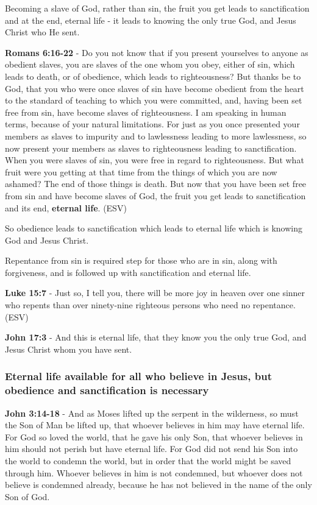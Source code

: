 \documentclass[11pt]{article}
\begin{document}
Becoming a slave of God, rather than sin, the fruit you get leads to sanctification and at the end, eternal life - it leads to knowing the only true God, and Jesus Christ who He sent.

\textbf{Romans 6:16-22} - Do you not know that if you present yourselves to anyone as obedient slaves, you are slaves of the one whom you obey, either of sin, which leads to death, or of obedience, which leads to righteousness? But thanks be to God, that you who were once slaves of sin have become obedient from the heart to the standard of teaching to which you were committed, and, having been set free from sin, have become slaves of righteousness. I am speaking in human terms, because of your natural limitations. For just as you once presented your members as slaves to impurity and to lawlessness leading to more lawlessness, so now present your members as slaves to righteousness leading to sanctification. When you were slaves of sin, you were free in regard to righteousness. But what fruit were you getting at that time from the things of which you are now ashamed? The end of those things is death. But now that you have been set free from sin and have become slaves of God, the fruit you get leads to sanctification and its end, \textbf{eternal life}. (ESV)

So obedience leads to sanctification which leads to eternal life which is knowing God and Jesus Christ.

Repentance from sin is required step for those who are in sin, along with forgiveness, and is followed up with sanctification and eternal life.

\textbf{Luke 15:7} - Just so, I tell you, there will be more joy in heaven over one sinner who repents than over ninety-nine righteous persons who need no repentance. (ESV)

\textbf{John 17:3} - And this is eternal life, that they know you the only true God, and Jesus Christ whom you have sent.

\subsubsection{Eternal life \textbf{available} for all who believe in Jesus, but obedience and sanctification is necessary}
\label{sec:org5306944}
\textbf{John 3:14-18} - And as Moses lifted up the serpent in the wilderness, so must the Son of Man be lifted up, that whoever believes in him may have eternal life. For God so loved the world, that he gave his only Son, that whoever believes in him should not perish but have eternal life. For God did not send his Son into the world to condemn the world, but in order that the world might be saved through him. Whoever believes in him is not condemned, but whoever does not believe is condemned already, because he has not believed in the name of the only Son of God.
\end{document}
